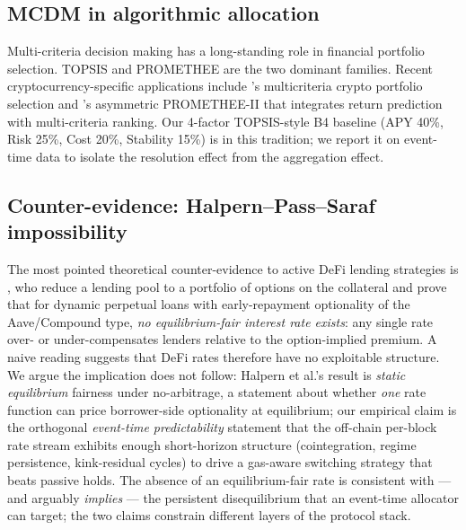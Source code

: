 \subsection{MCDM in algorithmic allocation}
\label{sec:bg-mcdm}

Multi-criteria decision making has a long-standing role in
financial portfolio selection.  TOPSIS \cite{hwang1981mcdm} and
PROMETHEE \cite{brans1985promethee} are the two dominant families.
Recent cryptocurrency-specific applications include
\cite{aljinovic2021crypto}'s multicriteria crypto portfolio
selection and \cite{hosseinzadeh2023promethee}'s asymmetric
PROMETHEE-II that integrates return prediction with multi-criteria
ranking.  Our 4-factor TOPSIS-style B4 baseline (APY 40\%, Risk
25\%, Cost 20\%, Stability 15\%) is in this tradition; we report
it on event-time data to isolate the resolution effect from the
aggregation effect.

\subsection{Counter-evidence: Halpern--Pass--Saraf impossibility}
\label{sec:bg-impossibility}

The most pointed theoretical counter-evidence to active DeFi
lending strategies is \cite{halpern2024fair}, who reduce a lending
pool to a portfolio of options on the collateral and prove that
for dynamic perpetual loans with early-repayment optionality of
the Aave/Compound type, \emph{no equilibrium-fair interest rate
exists}: any single rate over- or under-compensates lenders
relative to the option-implied premium.  A naive reading suggests
that DeFi rates therefore have no exploitable structure.  We argue
the implication does not follow: Halpern et al.'s result is
\emph{static equilibrium} fairness under no-arbitrage, a statement
about whether \emph{one} rate function can price borrower-side
optionality at equilibrium; our empirical claim is the orthogonal
\emph{event-time predictability} statement that the off-chain
per-block rate stream exhibits enough short-horizon structure
(cointegration, regime persistence, kink-residual cycles) to drive
a gas-aware switching strategy that beats passive holds.  The
absence of an equilibrium-fair rate is consistent with --- and
arguably \emph{implies} --- the persistent disequilibrium that an
event-time allocator can target; the two claims constrain different
layers of the protocol stack.
